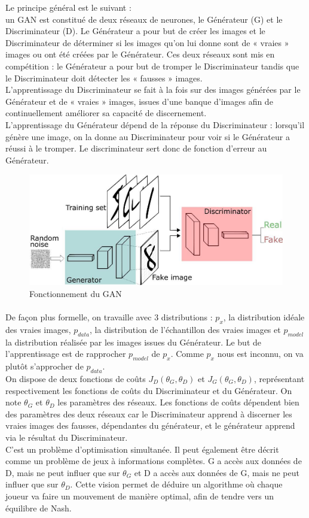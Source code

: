 		Le principe général est le suivant : \\ un GAN est constitué de deux réseaux de neurones, le Générateur (G) et le Discriminateur (D). Le Générateur a pour but de créer les images et le Discriminateur de déterminer si les images qu’on lui donne sont de « vraies » images ou ont été créées par le Générateur. Ces deux réseaux sont mis en compétition : le Générateur a pour but de tromper le Discriminateur tandis que le Discriminateur doit détecter les « fausses » images.\\
		L’apprentissage du Discriminateur se fait à la fois sur des images générées par le Générateur et de « vraies » images, issues d’une banque d’images afin de continuellement améliorer sa capacité de discernement.\\
		L’apprentissage du Générateur dépend de la réponse du  Discriminateur : lorsqu’il génère une image, on la donne au Discriminateur pour voir si le Générateur a réussi à le tromper. Le discriminateur sert donc de fonction d'erreur au Générateur.
	
\begin{figure}[h]
  \centerline{\includegraphics[width=0.6\linewidth]{fig/conceptGAN.png}}
  \caption{Fonctionnement du GAN}
  \label{fig:concept_gan}
\end{figure}

	\paragraph{}
		De façon plus formelle, on travaille avec 3 distributions : $p_x$, la distribution idéale des vraies images, $p_{data}$, la distribution de l'échantillon des vraies images et $p_{model}$ la distribution réalisée par les images issues du Générateur. Le but de l’apprentissage est de rapprocher $p_{model}$ de $p_x$. Comme $p_x$ nous est inconnu, on va plutôt s'approcher de $p_{data}$.\\
		On dispose de deux fonctions de coûts $J_D(\theta_G, \theta_D)$ et $J_G(\theta_G, \theta_D)$, représentant respectivement les fonctions de coûts du Discriminateur et du Générateur. On note $\theta_G$ et $\theta_D$ les paramètres des réseaux. Les fonctions de coûts dépendent bien des paramètres des deux réseaux car le Discriminateur apprend à discerner les vraies images des fausses, dépendantes du générateur, et le générateur apprend via le résultat du Discriminateur.\\ C'est un problème d'optimisation simultanée. 
		Il peut également être décrit comme un problème de jeux à informations complètes. G a accès aux données de D, mais ne peut influer que sur $\theta_G$ et D a accès aux données de G, mais ne peut influer que sur $\theta_D$. Cette vision permet de déduire un algorithme où chaque joueur va faire un mouvement de manière optimal, afin de tendre vers un équilibre de Nash.

